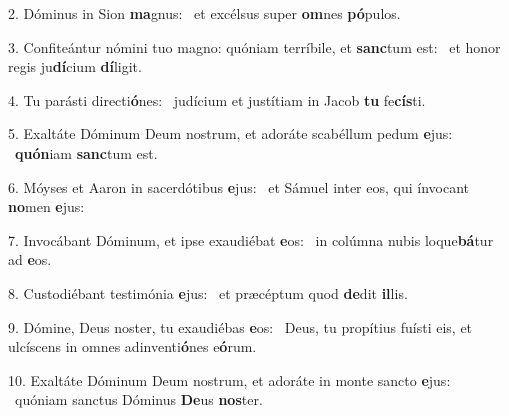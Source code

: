 2. Dóminus in Sion \textbf{ma}gnus: \ast\  et excélsus super \textbf{om}nes \textbf{pó}pulos.\

3. Confiteántur nómini tuo magno: quóniam terríbile, et \textbf{sanc}tum est: \ast\  et honor regis ju\textbf{dí}cium \textbf{dí}ligit.\

4. Tu parásti directi\textbf{ó}nes: \ast\  judícium et justítiam in Jacob \textbf{tu} fe\textbf{cís}ti.\

5. Exaltáte Dóminum Deum nostrum, et adoráte scabéllum pedum \textbf{e}jus: \ast\  \textbf{quón}iam \textbf{sanc}tum est.\

6. Móyses et Aaron in sacerdótibus \textbf{e}jus: \ast\  et Sámuel inter eos, qui ínvocant \textbf{no}men \textbf{e}jus:\

7. Invocábant Dóminum, et ipse exaudiébat \textbf{e}os: \ast\  in colúmna nubis loque\textbf{bá}tur ad \textbf{e}os.\

8. Custodiébant testimónia \textbf{e}jus: \ast\  et præcéptum quod \textbf{de}dit \textbf{il}lis.\

9. Dómine, Deus noster, tu exaudiébas \textbf{e}os: \ast\  Deus, tu propítius fuísti eis, et ulcíscens in omnes adinventi\textbf{ó}nes e\textbf{ó}rum.\

10. Exaltáte Dóminum Deum nostrum, et adoráte in monte sancto \textbf{e}jus: \ast\  quóniam sanctus Dóminus \textbf{De}us \textbf{nos}ter.\

